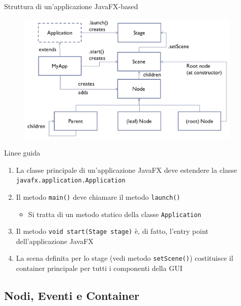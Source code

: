 \documentclass[presentation]{beamer}
\begin{document}
%

\begin{frame}{Struttura di un'applicazione JavaFX-based}
\begin{figure}
\includegraphics[width=0.95\textwidth]{img/javafx-app-arch.png}
\end{figure}
\end{frame}

\begin{frame}{Linee guida}
\begin{enumerate}\itemsep20pt
\item La classe principale di un'applicazione JavaFX deve estendere la classe \texttt{javafx.application.Application}
\item Il metodo \texttt{main()} deve chiamare il metodo \texttt{launch()}
\begin{itemize}
\item Si tratta di un metodo statico della classe \texttt{Application}
\end{itemize}
\item Il metodo \texttt{void start(Stage stage)} è, di fatto, l'entry point dell'applicazione JavaFX
\item La scena definita per lo stage (vedi metodo \texttt{setScene()}) costituisce il container principale per tutti i componenti della GUI
\end{enumerate}
\end{frame}

\subsection{Nodi, Eventi e Container}
\end{document}
